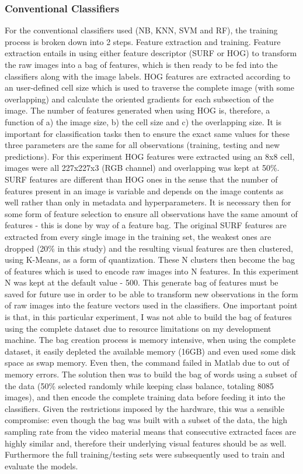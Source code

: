 \documentclass[11pt]{article}
\begin{document}
        \subsubsection{Conventional Classifiers}
            For the conventional classifiers used (NB, KNN, SVM and RF), the training process is broken down into 2 steps. Feature extraction and training. Feature extraction entails in using either feature descriptor (SURF or HOG) to transform the raw images into a bag of features, which is then ready to be fed into the classifiers along with the image labels.
            HOG features are extracted according to an user-defined cell size which is used to traverse the complete image (with some overlapping) and calculate the oriented gradients for each subsection of the image. The number of features generated when using HOG is, therefore, a function of a) the image size, b) the cell size and c) the overlapping size. It is important for classification tasks then to ensure the exact same values for these three parameters are the same for all observations (training, testing and new predictions). For this experiment HOG features were extracted using an 8x8 cell, images were all 227x227x3 (RGB channel) and overlapping was kept at 50\%.
            SURF features are different than HOG ones in the sense that the number of features present in an image is variable and depends on the image contents as well rather than only in metadata and hyperparameters. It is necessary then for some form of feature selection to ensure all observations have the same amount of features - this is done by way of a feature bag. The original SURF features are extracted from every single image in the training set, the weakest ones are dropped (20\% in this study) and the resulting visual features are then clustered, using K-Means, as a form of quantization. These N clusters then become the bag of features which is used to encode raw images into N features. In this experiment N was kept at the default value - 500. This generate bag of features must be saved for future use in order to be able to transform new observations in the form of raw images into the feature vectors used in the classifiers.
            One important point is that, in this particular experiment, I was not able to build the bag of features using the complete dataset due to resource limitations on my development machine. The bag creation process is memory intensive, when using the complete dataset, it easily depleted the available memory (16GB) and even used some disk space as swap memory. Even then, the command failed in Matlab due to out of memory errors. The solution then was to build the bag of words using a subset of the data (50\% selected randomly while keeping class balance, totaling 8085 images), and then encode the complete training data before feeding it into the classifiers. Given the restrictions imposed by the hardware, this was a sensible compromise: even though the bag was built with a subset of the data, the high sampling rate from the video material means that consecutive extracted faces are highly similar and, therefore their underlying visual features should be as well. Furthermore the full training/testing sets were subsequently used to train and evaluate the models.
\end{document}
